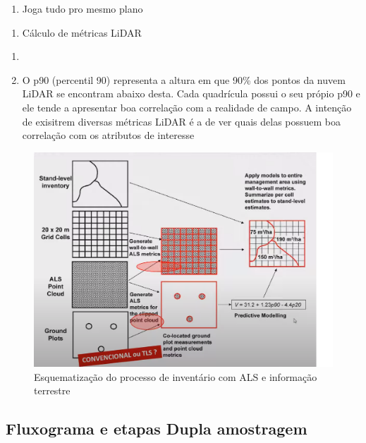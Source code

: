 \documentclass[
]{article}
\providecommand{\tightlist}{%
  \setlength{\itemsep}{0pt}\setlength{\parskip}{0pt}}
\begin{document}
\begin{enumerate}
\def\labelenumi{\roman{enumi}.}
\tightlist
\item
  Joga tudo pro mesmo plano
\end{enumerate}

\begin{enumerate}
\def\labelenumi{\arabic{enumi}.}
\setcounter{enumi}{8}
\tightlist
\item
  Cálculo de métricas LiDAR
\end{enumerate}

\begin{enumerate}
\def\labelenumi{\roman{enumi}.}
\tightlist
\item
\item
  O p90 (percentil 90) representa a altura em que 90\% dos pontos da
  nuvem LiDAR se encontram abaixo desta. Cada quadrícula possui o seu
  própio p90 e ele tende a apresentar boa correlação com a realidade de
  campo. A intenção de exisitrem diversas métricas LiDAR é a de ver
  quais delas possuem boa correlação com os atributos de interesse
\end{enumerate}

\begin{figure}

{\centering \includegraphics[width=0.8\linewidth]{IMAGES/als-e-info-campo} 

}

\caption{Esquematização do processo de inventário com ALS e informação terrestre}\label{fig:unnamed-chunk-8}
\end{figure}

\newpage

\subsection{Fluxograma e etapas Dupla
amostragem}\label{fluxograma-e-etapas-dupla-amostragem}
\end{document}
